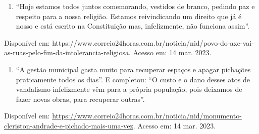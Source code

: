 \begin{escolha}
{{{{{{\begin{enumerate}
\def\labelenumi{\alph{enumi}.}
\item
  ``Hoje estamos todos juntos comemorando, vestidos de branco, pedindo
  paz e respeito para a nossa religião. Estamos reivindicando um direito
  que já é nosso e está escrito na Constituição mas, infelizmente, não
  funciona assim''.
\end{enumerate}

Disponível em:
https://www.correio24horas.com.br/noticia/nid/povo-do-axe-vai-as-ruas-pelo-fim-da-intolerancia-religiosa.
Acesso em: 14 mar. 2023.

\begin{enumerate}
\def\labelenumi{\alph{enumi}.}
\item
  ``A gestão municipal gasta muito para recuperar espaços e apagar
  pichações praticamente todos os dias''. E completou: ``O custo e o
  dano desses atos de vandalismo infelizmente vêm para a própria
  população, pois deixamos de fazer novas obras, para recuperar
  outras''.
\end{enumerate}

Disponível em:
\url{https://www.correio24horas.com.br/noticia/nid/monumento-cleriston-andrade-e-pichado-mais-uma-vez}.
Acesso em: 14 mar. 2023.

}}}}}}
\end{escolha}
